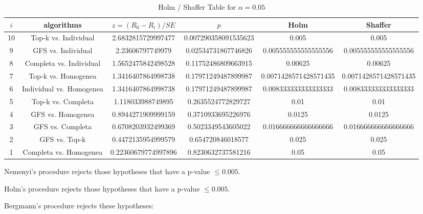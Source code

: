 \documentclass[a4paper,10pt]{article}
\begin{document}
\begin{landscape}
\begin{table}[!htp]
\centering\tiny
\caption{Holm / Shaffer Table for $\alpha=0.05$}
\begin{tabular}{cccccc}
$i$&algorithms&$z=(R_0 - R_i)/SE$&$p$&Holm&Shaffer\\
\hline
10&Top-k vs. Individual&2.6832815729997477&0.007290358091535623&0.005&0.005\\
9&GFS vs. Individual&2.23606797749979&0.02534731867746826&0.005555555555555556&0.005555555555555556\\
8&Completa vs. Individual&1.5652475842498528&0.11752486809663915&0.00625&0.00625\\
7&Top-k vs. Homogenea&1.3416407864998738&0.17971249487899987&0.0071428571428571435&0.0071428571428571435\\
6&Individual vs. Homogenea&1.3416407864998738&0.17971249487899987&0.008333333333333333&0.008333333333333333\\
5&Top-k vs. Completa&1.118033988749895&0.2635524772829727&0.01&0.01\\
4&GFS vs. Homogenea&0.8944271909999159&0.3710933695226976&0.0125&0.0125\\
3&GFS vs. Completa&0.6708203932499369&0.5023349543605022&0.016666666666666666&0.016666666666666666\\
2&GFS vs. Top-k&0.4472135954999579&0.654720846018577&0.025&0.025\\
1&Completa vs. Homogenea&0.22360679774997896&0.8230632737581216&0.05&0.05\\
\hline
\end{tabular}
\end{table}
Nemenyi's procedure rejects those hypotheses that have a p-value $\le0.005$.


Holm's procedure rejects those hypotheses that have a p-value $\le0.005$.


Bergmann's procedure rejects these hypotheses:


\begin{itemize}


\end{itemize}



\end{landscape}
\end{document}
